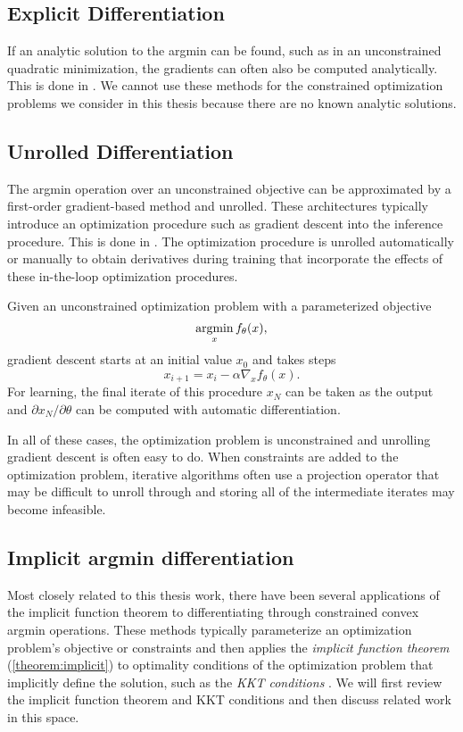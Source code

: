 \subsection{Explicit Differentiation}
If an analytic solution to the argmin can be found,
such as in an unconstrained quadratic minimization,
the gradients can often also be computed analytically.
This is done in \citet{tappen2007learning,schmidt2014shrinkage}.
We cannot use these methods for
the constrained optimization problems
we consider in this thesis because
there are no known analytic solutions.

\subsection{Unrolled Differentiation}
\label{sec:bg:unroll}
The argmin operation over an unconstrained objective can be approximated
by a first-order gradient-based method and unrolled.
These architectures typically introduce an optimization
procedure such as gradient descent into the inference procedure.
This is done in
\citet{domke2012generic,belanger2017end,metz2016unrolled,goodfellow2013multi,stoyanov2011empirical,brakel2013training,finn2017model}.
The optimization procedure is unrolled automatically or manually
\citep{domke2012generic} to obtain derivatives during training that incorporate
the effects of these in-the-loop optimization procedures.

Given an unconstrained optimization problem with a
parameterized objective
$$\operatorname*{argmin}_x f_\theta(x),$$
gradient descent starts at an initial value $x_0$ and
takes steps $$x_{i+1} = x_i - \alpha \nabla_x f_\theta(x).$$
For learning, the final iterate of this procedure $x_N$ can
be taken as the output and
$\partial x_N/\partial \theta$ can
be computed with automatic differentiation.

In all of these cases, the optimization problem is unconstrained
and unrolling gradient descent is often easy to do.
When constraints are added to the optimization problem, iterative
algorithms often use a projection operator that may be difficult
to unroll through and storing all of the intermediate iterates
may become infeasible.

\subsection{Implicit argmin differentiation}
\label{sec:bg:argmin-diff}
Most closely related to this thesis work, there have been
several applications of the implicit function theorem
to differentiating through constrained convex argmin
operations.
These methods typically parameterize an optimization problem's
objective or constraints and then applies the
\emph{implicit function theorem} (\cref{theorem:implicit})
to optimality conditions
of the optimization problem that implicitly define
the solution, such as the \emph{KKT conditions}
\citep[Section~5.5.3]{boyd2004convex}.
We will first review the implicit function theorem
and KKT conditions and then discuss related work
in this space.

